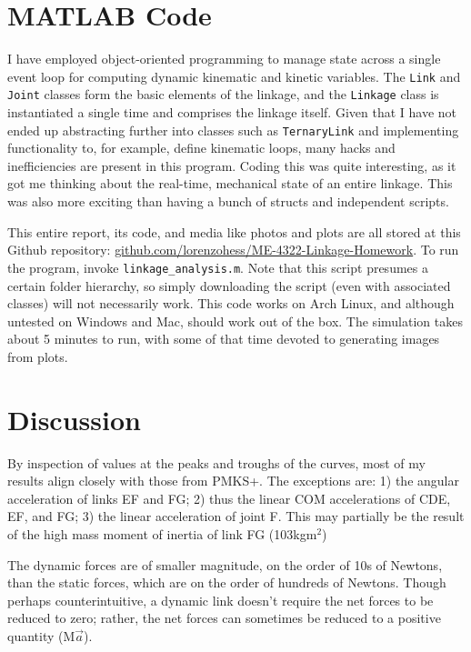 \documentclass[12pt]{article}
\begin{document}
\section{MATLAB Code}%
\label{code}

I have employed object-oriented programming to manage state across a single event loop for computing dynamic kinematic and kinetic variables. The \texttt{Link} and \texttt{Joint} classes form the basic elements of the linkage, and the \texttt{Linkage} class is instantiated a single time and comprises the linkage itself. Given that I have not ended up abstracting further into classes such as \texttt{TernaryLink} and implementing functionality to, for example, define kinematic loops, many hacks and inefficiencies are present in this program. Coding this was quite interesting, as it got me thinking about the real-time, mechanical state of an entire linkage. This was also more exciting than having a bunch of structs and independent scripts.

This entire report, its code, and media like photos and plots are all stored at this Github repository: \href{https://github.com/lorenzohess/ME-4322-Linkage-Homework}{github.com/lorenzohess/ME-4322-Linkage-Homework}. To run the program, invoke \texttt{linkage\_analysis.m}. Note that this script presumes a certain folder hierarchy, so simply downloading the script (even with associated classes) will not necessarily work. This code works on Arch Linux, and although untested on Windows and Mac, should work out of the box. The simulation takes about 5 minutes to run, with some of that time devoted to generating images from plots.

\section{Discussion}%
\label{discuss}

By inspection of values at the peaks and troughs of the curves, most of my results align closely with those from PMKS+. The exceptions are: 1) the angular acceleration of links EF and FG; 2) thus the linear COM accelerations of CDE, EF, and FG; 3) the linear acceleration of joint F. This may partially be the result of the high mass moment of inertia of link FG (103kgm$^{2}$)

The dynamic forces are of smaller magnitude, on the order of 10s of Newtons, than the static forces, which are on the order of hundreds of Newtons. Though perhaps counterintuitive, a dynamic link doesn't require the net forces to be reduced to zero; rather, the net forces can sometimes be reduced to a positive quantity (M$\vec{a}$).
\end{document}
